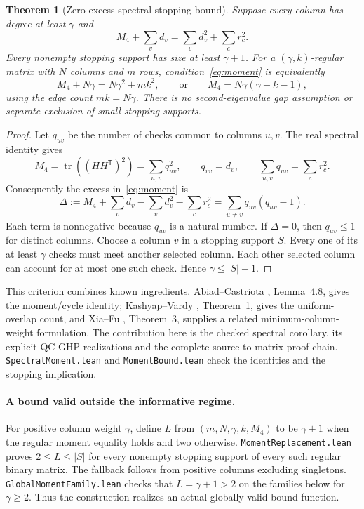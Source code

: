 \documentclass[11pt]{article}
\newtheorem{theorem}{Theorem}
\begin{document}
\begin{theorem}[Zero-excess spectral stopping bound]\label{thm:moment}
Suppose every column has degree at least $\gamma$ and
\begin{equation}\label{eq:moment}
 M_4+\sum_v d_v=\sum_v d_v^2+\sum_c r_c^2.
\end{equation}
Every nonempty stopping support has size at least $\gamma+1$.
For a $(\gamma,k)$-regular matrix with $N$ columns and $m$ rows,
condition~\eqref{eq:moment} is equivalently
\[
 M_4+N\gamma=N\gamma^2+mk^2,
 \qquad\text{or}\qquad M_4=N\gamma(\gamma+k-1),
\]
using the edge count $mk=N\gamma$. There is no second-eigenvalue gap
assumption or separate exclusion of small stopping supports.
\end{theorem}
\begin{proof}
Let $q_{uv}$ be the number of checks common to columns $u,v$.
The real spectral identity gives
\[
 M_4=\operatorname{tr}((HH^{\mathsf T})^2)
     =\sum_{u,v}q_{uv}^2,
 \qquad q_{vv}=d_v,\qquad \sum_{u,v}q_{uv}=\sum_cr_c^2.
\]
Consequently the excess in~\eqref{eq:moment} is
\begin{equation}\label{eq:excess}
 \Delta:=M_4+\sum_vd_v-\sum_vd_v^2-\sum_cr_c^2
        =\sum_{u\ne v}q_{uv}(q_{uv}-1).
\end{equation}
Each term is nonnegative because $q_{uv}$ is a natural number. If $\Delta=0$,
then $q_{uv}\le1$ for distinct columns. Choose a column $v$ in a stopping
support $S$. Every one of its at least $\gamma$ checks must meet another
selected column. Each other selected column can account for at most one such
check. Hence $\gamma\le |S|-1$.
\end{proof}

This criterion combines known ingredients. Abiad--Castriota \cite{ref1}, Lemma~4.8,
gives the moment/cycle identity; Kashyap--Vardy \cite{ref2}, Theorem~1, gives the
uniform-overlap count, and Xia--Fu \cite{ref8}, Theorem~3, supplies a related
minimum-column-weight formulation. The contribution here is the checked
spectral corollary, its explicit QC-GHP realizations and the complete
source-to-matrix proof chain. \texttt{SpectralMoment.lean} and
\texttt{MomentBound.lean} check the identities and the stopping implication.

\paragraph{A bound valid outside the informative regime.}
For positive column weight $\gamma$, define $L$ from $(m,N,\gamma,k,M_4)$ to be
$\gamma+1$ when the regular moment equality holds and two otherwise.
\texttt{MomentReplacement.lean} proves $2\le L\le |S|$ for every nonempty
stopping support of every such regular binary matrix. The fallback follows
from positive columns excluding singletons. \texttt{GlobalMomentFamily.lean}
checks that $L=\gamma+1>2$ on the families below for $\gamma\ge2$.
Thus the construction realizes an actual globally valid bound function.
\end{document}
